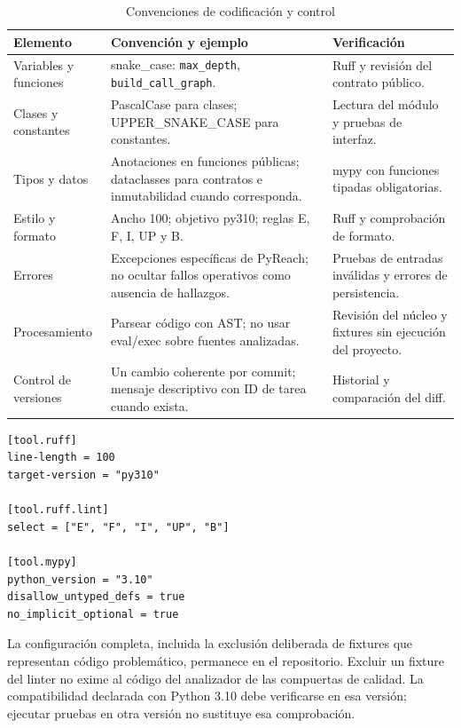 \begin{table}[H]
\centering\small{}
\caption{Convenciones de codificación y control}
\begin{tabularx}{\textwidth}{P{3cm}YY}
\toprule
\textbf{Elemento} & \textbf{Convención y ejemplo} & \textbf{Verificación} \\
\midrule
Variables y funciones & snake\_case: \texttt{max\_\allowbreak depth}, \texttt{build\_\allowbreak call\_\allowbreak graph}. & Ruff y revisión del contrato público. \\
\addlinespace
Clases y constantes & PascalCase para clases; UPPER\_SNAKE\_CASE para constantes. & Lectura del módulo y pruebas de interfaz. \\
\addlinespace
Tipos y datos & Anotaciones en funciones públicas; dataclasses para contratos e inmutabilidad cuando corresponda. & mypy con funciones tipadas obligatorias. \\
\addlinespace
Estilo y formato & Ancho 100; objetivo py310; reglas E, F, I, UP y B. & Ruff y comprobación de formato. \\
\addlinespace
Errores & Excepciones específicas de PyReach; no ocultar fallos operativos como ausencia de hallazgos. & Pruebas de entradas inválidas y errores de persistencia. \\
\addlinespace
Procesamiento & Parsear código con AST; no usar eval/exec sobre fuentes analizadas. & Revisión del núcleo y fixtures sin ejecución del proyecto. \\
\addlinespace
Control de versiones & Un cambio coherente por commit; mensaje descriptivo con ID de tarea cuando exista. & Historial y comparación del diff. \\
\bottomrule
\end{tabularx}
\end{table}

\par\noindent\begin{minipage}{\textwidth}
\begin{lstlisting}[style=p8,caption={Configuración efectiva de Ruff y tipado}]
[tool.ruff]
line-length = 100
target-version = "py310"

[tool.ruff.lint]
select = ["E", "F", "I", "UP", "B"]

[tool.mypy]
python_version = "3.10"
disallow_untyped_defs = true
no_implicit_optional = true
\end{lstlisting}
\end{minipage}\par\medskip
La configuración completa, incluida la exclusión deliberada de fixtures que representan código problemático, permanece en el repositorio. Excluir un fixture del linter no exime al código del analizador de las compuertas de calidad. La compatibilidad declarada con Python 3.10 debe verificarse en esa versión; ejecutar pruebas en otra versión no sustituye esa comprobación.

